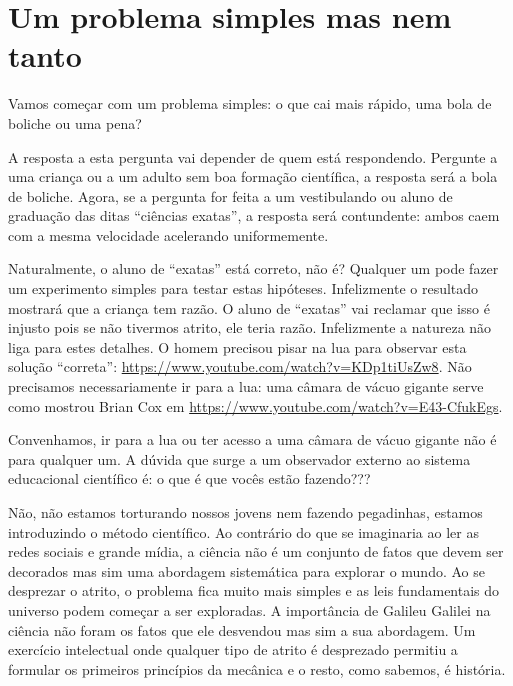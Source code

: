 \documentclass[article,12pt,oneside,a4paper,english,brazil,sumario=tradicional]{abntex2}
\date{2022}
\newcommand{\relatnum}{XYZ ABC-DEF}
\begin{document}

\imprimirfolhaderosto


\section{Um problema simples mas nem tanto}
\label{sec:intro}

Vamos começar com um problema simples: o que cai mais rápido, uma bola de boliche ou uma pena?

A resposta a esta pergunta vai depender de quem está respondendo. Pergunte a uma criança ou a um adulto sem boa formação científica, a resposta será a bola de boliche. Agora, se a pergunta for feita a um vestibulando ou aluno de graduação das ditas ``ciências exatas'', a resposta será contundente: ambos caem com a mesma velocidade acelerando uniformemente.

Naturalmente, o aluno de ``exatas'' está correto, não é? Qualquer um pode fazer um experimento simples para testar estas hipóteses. Infelizmente o resultado mostrará que a criança tem razão. O aluno de ``exatas'' vai reclamar que isso é injusto pois se não tivermos atrito, ele teria razão. Infelizmente a natureza não liga para estes detalhes. O homem precisou pisar na lua para observar esta solução ``correta'': \url{https://www.youtube.com/watch?v=KDp1tiUsZw8}. Não precisamos necessariamente ir para a lua: uma câmara de vácuo gigante serve como mostrou Brian Cox em \url{https://www.youtube.com/watch?v=E43-CfukEgs}.

Convenhamos, ir para a lua ou ter acesso a uma câmara de vácuo gigante não é para qualquer um. A dúvida que surge a um observador externo ao sistema educacional científico é: o que é que vocês estão fazendo???

Não, não estamos torturando nossos jovens nem fazendo pegadinhas, estamos introduzindo o método científico. Ao contrário do que se imaginaria ao ler as redes sociais e grande mídia, a ciência não é um conjunto de fatos que devem ser decorados mas sim uma abordagem sistemática para explorar o mundo. Ao se desprezar o atrito, o problema fica muito mais simples e as leis fundamentais do universo podem começar a ser exploradas. A importância de Galileu Galilei na ciência não foram os fatos que ele desvendou mas sim a sua abordagem. Um exercício intelectual onde qualquer tipo de atrito é desprezado permitiu a formular os primeiros princípios da mecânica e o resto, como sabemos,  é história.
\end{document}
